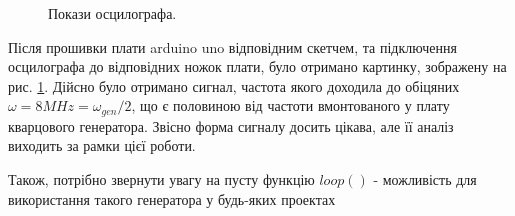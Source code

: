 \begin{figure}[h]
\caption{Покази осцилографа.}
\label{fig:results}
\end{figure}

Після прошивки плати arduino uno відповідним скетчем, та підключення осцилографа до відповідних ножок плати, було отримано картинку, зображену на рис. \ref{fig:results}. Дійсно було отримано сигнал, частота якого доходила до обіцяних $\omega=8 MHz = \omega_{gen}/2$, що є половиною від частоти вмонтованого у плату кварцового генератора. Звісно форма сигналу досить цікава, але її аналіз виходить за рамки цієї роботи. 

Також, потрібно звернути увагу на пусту функцію $loop()$ - можливість для використання такого генератора у будь-яких проектах

